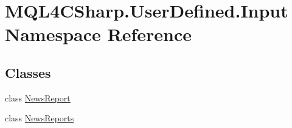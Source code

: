 \hypertarget{namespace_m_q_l4_c_sharp_1_1_user_defined_1_1_input}{}\section{M\+Q\+L4\+C\+Sharp.\+User\+Defined.\+Input Namespace Reference}
\label{namespace_m_q_l4_c_sharp_1_1_user_defined_1_1_input}
\subsection*{Classes}
\begin{DoxyCompactItemize}
\item 
class \hyperlink{class_m_q_l4_c_sharp_1_1_user_defined_1_1_input_1_1_news_report}{News\+Report}
\item 
class \hyperlink{class_m_q_l4_c_sharp_1_1_user_defined_1_1_input_1_1_news_reports}{News\+Reports}
\end{DoxyCompactItemize}
